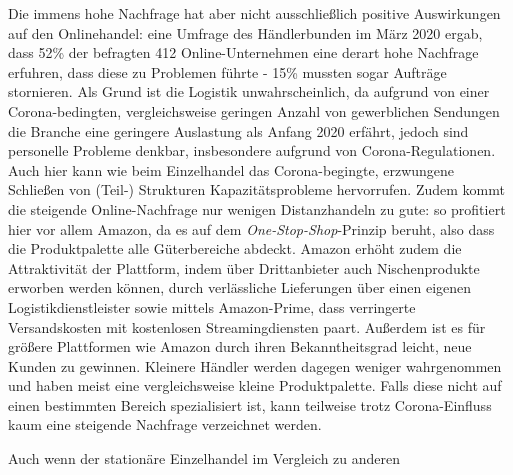\begin{folding}
Die immens hohe Nachfrage hat aber nicht ausschließlich positive Auswirkungen auf den Onlinehandel: eine Umfrage des Händlerbunden im März 2020 ergab, dass 52\% der befragten 412 Online-Unternehmen eine derart hohe Nachfrage erfuhren, dass diese zu Problemen führte - 15\% mussten sogar Aufträge stornieren. Als Grund ist die Logistik unwahrscheinlich, da aufgrund von einer Corona-bedingten, vergleichsweise geringen Anzahl von gewerblichen Sendungen die Branche eine geringere Auslastung als Anfang 2020 erfährt, jedoch sind personelle Probleme denkbar, insbesondere aufgrund von Corona-Regulationen\cite{haendlerbund-studie}. Auch hier kann wie beim Einzelhandel das Corona-begingte, erzwungene Schließen von (Teil-) Strukturen Kapazitätsprobleme hervorrufen. Zudem kommt die steigende Online-Nachfrage nur wenigen Distanzhandeln zu gute: so profitiert hier vor allem Amazon, da es auf dem \emph{One-Stop-Shop}-Prinzip beruht, also dass die Produktpalette alle Güterbereiche abdeckt. Amazon erhöht zudem die Attraktivität der Plattform, indem über Drittanbieter auch Nischenprodukte erworben werden können, durch verlässliche Lieferungen über einen eigenen Logistikdienstleister sowie mittels Amazon-Prime, dass verringerte Versandskosten mit kostenlosen Streamingdiensten paart. Außerdem ist es für größere Plattformen wie Amazon durch ihren Bekanntheitsgrad leicht, neue Kunden zu gewinnen. Kleinere Händler werden dagegen weniger wahrgenommen und haben meist eine vergleichsweise kleine Produktpalette. Falls diese nicht auf einen bestimmten Bereich spezialisiert ist, kann teilweise trotz Corona-Einfluss kaum eine steigende Nachfrage verzeichnet werden\cite{corona-amazon}. 

Auch wenn der stationäre Einzelhandel im Vergleich zu anderen



  
 
\end{folding}
